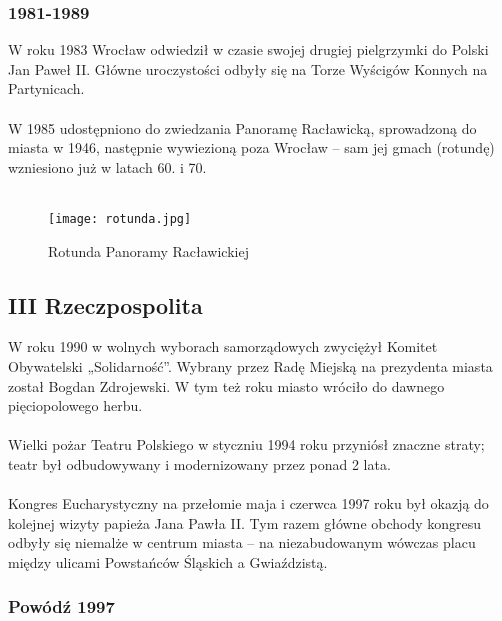 \documentclass[12pt]{article}
\begin{document}
\subsubsection{1981-1989}

W roku 1983 Wrocław odwiedził w czasie swojej drugiej pielgrzymki do Polski Jan Paweł II. Główne uroczystości odbyły się na Torze Wyścigów Konnych na Partynicach.\\\\
W 1985 udostępniono do zwiedzania Panoramę Racławicką, sprowadzoną do miasta w 1946, następnie wywiezioną poza Wrocław – sam jej gmach (rotundę) wzniesiono już w latach 60. i 70.\\\\
\begin{figure}[h]
    \centering
    \texttt{[image: rotunda.jpg]}
    \caption{Rotunda Panoramy Racławickiej}
    \label{fig:rotunda}
\end{figure}

\subsection{III Rzeczpospolita}

W roku 1990 w wolnych wyborach samorządowych zwyciężył Komitet Obywatelski „Solidarność”. Wybrany przez Radę Miejską na prezydenta miasta został Bogdan Zdrojewski. W tym też roku miasto wróciło do dawnego pięciopolowego herbu.\\\\
Wielki pożar Teatru Polskiego w styczniu 1994 roku przyniósł znaczne straty; teatr był odbudowywany i modernizowany przez ponad 2 lata.\\\\
Kongres Eucharystyczny na przełomie maja i czerwca 1997 roku był okazją do kolejnej wizyty papieża Jana Pawła II. Tym razem główne obchody kongresu odbyły się niemalże w centrum miasta – na niezabudowanym wówczas placu między ulicami Powstańców Śląskich a Gwiaździstą.

\subsubsection{Powódź 1997}
\end{document}
